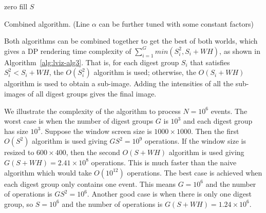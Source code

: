 \begin{algorithm}[htb]
\BlankLine
zero fill $S$\;
\caption{Combined algorithm.
(Line $\alpha$ can be further tuned with some constant factors)}
\label{alg:lviz-alg3}
\end{algorithm}

Both algorithms can be combined together to
get the best of both worlds, which gives
a DP rendering time complexity of $\sum_{i=1}^{G} min(S_i^2, S_i + W H)$,
as shown in Algorithm~\ref{alg:lviz-alg3}.
That is, for each digest group $S_i$ that satisfies $S_i^2 < S_i+W H$, 
the $O(S_i^2)$ algorithm is used;
otherwise, the $O(S_i + W H)$ algorithm is used to obtain a sub-image.
Adding the intensities of all the sub-images of all digest groups gives the final image.

We illustrate the complexity of the algorithm to process $N=10^6$ events.
The worst case is when the number of digest groups $G$ is $10^3$
and each digest group has size $10^3$.
Suppose the window screen size is $1000\times 1000$.
Then the first $O(S^2)$ algorithm is used giving $GS^2 = 10^9$ operations.
If the window size is resized to $600\times 400$, then
the second $O(S+W H)$ algorithm is used giving $G(S+WH)=2.41\times 10^8$ operations.
This is much faster than the naive algorithm which would take $O(10^{12})$
operations.
The best case is achieved when each digest group only contains one event.
This means $G = 10^6$ and the number of operations
is $G S^2=10^6$.
Another good case is when there is only one digest group,
so $S=10^6$ and the number of operations is $G(S + WH)=1.24\times10^6$.

